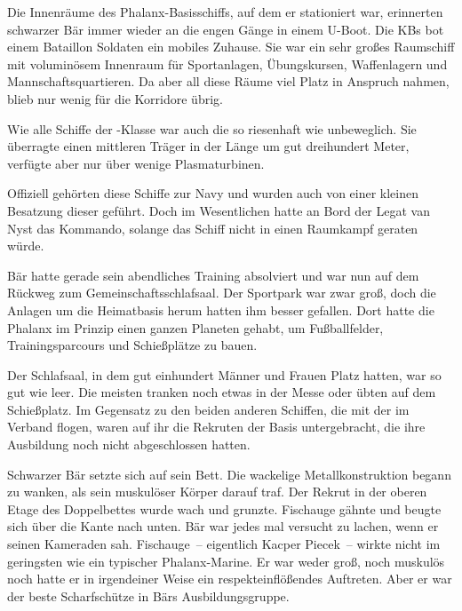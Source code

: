 Die Innenräume des Phalanx-Basisschiffs, auf dem er stationiert war, erinnerten schwarzer Bär immer wieder an die engen Gänge in einem U-Boot. Die  KBs bot einem Bataillon Soldaten ein mobiles Zuhause. Sie war ein sehr großes Raumschiff mit voluminösem Innenraum für Sportanlagen, Übungskursen, Waffenlagern und Mannschaftsquartieren. Da aber all diese Räume viel Platz in Anspruch nahmen, blieb nur wenig für die Korridore übrig.

\par

Wie alle Schiffe der -Klasse war auch die  so riesenhaft wie unbeweglich. Sie überragte einen mittleren Träger in der Länge um gut dreihundert Meter, verfügte aber nur über wenige Plasmaturbinen.

\par

Offiziell gehörten diese Schiffe zur Navy und wurden auch von einer kleinen Besatzung dieser geführt. Doch im Wesentlichen hatte an Bord der  Legat van Nyst das Kommando, solange das Schiff nicht in einen Raumkampf geraten würde.

\par

Bär hatte gerade sein abendliches Training absolviert und war nun auf dem Rückweg zum Gemeinschaftsschlafsaal. Der Sportpark war zwar groß, doch die Anlagen um die Heimatbasis herum hatten ihm besser gefallen. Dort hatte die Phalanx im Prinzip einen ganzen Planeten gehabt, um Fußballfelder, Trainingsparcours und Schießplätze zu bauen.

\par

Der Schlafsaal, in dem gut einhundert Männer und Frauen Platz hatten, war so gut wie leer. Die meisten tranken noch etwas in der Messe oder übten auf dem Schießplatz. Im Gegensatz zu den beiden anderen Schiffen, die mit der  im Verband flogen, waren auf ihr die Rekruten der Basis untergebracht, die ihre Ausbildung noch nicht abgeschlossen hatten.

\par

Schwarzer Bär setzte sich auf sein Bett. Die wackelige Metallkonstruktion begann zu wanken, als sein muskulöser Körper darauf traf. Der Rekrut in der oberen Etage des Doppelbettes wurde wach und grunzte. Fischauge gähnte und beugte sich über die Kante nach unten. Bär war jedes mal versucht zu lachen, wenn er seinen Kameraden sah. Fischauge~-- eigentlich Kacper Piecek~-- wirkte nicht im geringsten wie ein typischer Phalanx-Marine. Er war weder groß, noch muskulös noch hatte er in irgendeiner Weise ein respekteinflößendes Auftreten. Aber er war der beste Scharfschütze in Bärs Ausbildungsgruppe.

